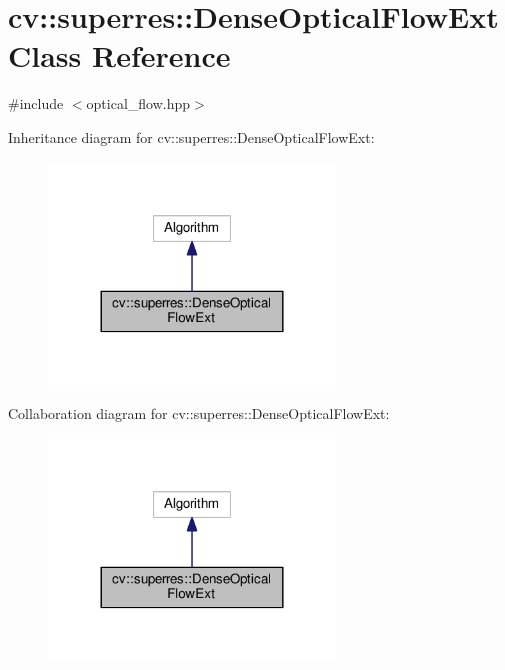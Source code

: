 \hypertarget{classcv_1_1superres_1_1DenseOpticalFlowExt}{\section{cv\-:\-:superres\-:\-:Dense\-Optical\-Flow\-Ext Class Reference}
\label{classcv_1_1superres_1_1DenseOpticalFlowExt}
}


{\ttfamily \#include $<$optical\-\_\-flow.\-hpp$>$}



Inheritance diagram for cv\-:\-:superres\-:\-:Dense\-Optical\-Flow\-Ext\-:\nopagebreak
\begin{figure}[H]
\begin{center}
\leavevmode
\includegraphics[width=216pt]{classcv_1_1superres_1_1DenseOpticalFlowExt__inherit__graph}
\end{center}
\end{figure}


Collaboration diagram for cv\-:\-:superres\-:\-:Dense\-Optical\-Flow\-Ext\-:\nopagebreak
\begin{figure}[H]
\begin{center}
\leavevmode
\includegraphics[width=216pt]{classcv_1_1superres_1_1DenseOpticalFlowExt__coll__graph}
\end{center}
\end{figure}

